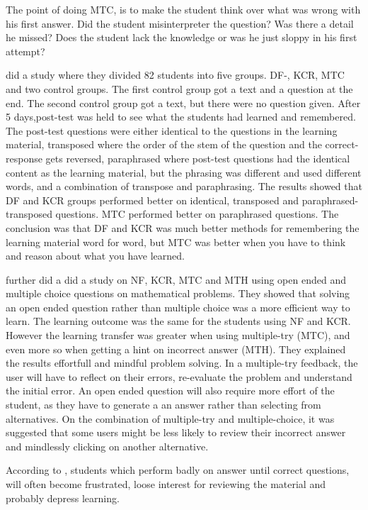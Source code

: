 \documentclass[a4paper,12pt]{book}
\begin{document}
The point of doing MTC, is to make the student think over what was wrong with his first answer. Did the student misinterpreter the question? Was there a detail he missed? Does the student lack the knowledge or was he just sloppy in his first attempt?

\textcite{Clariana2006} did a study where they divided 82 students into five groups. DF-, KCR, MTC and two control groups. The first control group got a text and a question at the end. The second control group got a text, but there were no question given. After 5 days,post-test was held to see what the students had learned and remembered. The post-test questions were either identical to the questions in the learning material, transposed where the order of the stem of the question and the correct-response gets reversed, paraphrased where post-test questions had the identical content as the learning material, but the phrasing was different and used different words, and a combination of transpose and paraphrasing. The results showed that DF and KCR groups performed better on identical, transposed and paraphrased-transposed questions. MTC performed better on paraphrased questions. The conclusion was that DF and KCR was much better methods for remembering the learning material word for word, but MTC was better when you have to think and reason about what you have learned.

\textcite{Attali2015} further did a did a study on NF, KCR, MTC and MTH using open ended and multiple choice questions on mathematical problems. They showed that solving an open ended question rather than multiple choice was a more efficient way to learn. The learning outcome was the same for the students using NF and KCR. However the learning transfer was greater when using multiple-try (MTC), and even more so when getting a hint on incorrect answer (MTH). They explained the results effortfull and mindful problem solving. In a multiple-try feedback, the user will have to reflect on their errors, re-evaluate the problem and understand the initial error. An open ended question will also require more effort of the student, as they have to generate a an answer rather than selecting from alternatives. On the combination of multiple-try and multiple-choice, it was suggested that some users might be less likely to review their incorrect answer and mindlessly clicking on another alternative. 



According to \textcite{Morrison1995}, students which perform badly on answer until correct questions,  will often become frustrated, loose interest for reviewing the material and probably depress learning.
\end{document}
